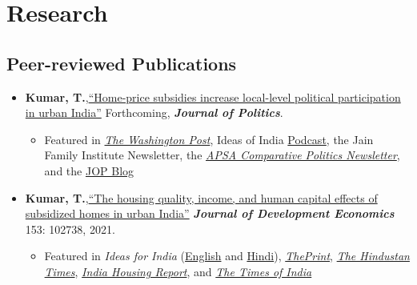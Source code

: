 \documentclass[11pt]{article}
\begin{document}
	
\vspace{2mm}
\color{MidnightBlue}

\section*{Research}
\color{Black}


\subsection*{Peer-reviewed Publications}
\begin{itemize}
	



			\item[] \textbf{Kumar, T.},\href{https://doi.org/10.1086/715605}{``Home-price subsidies increase local-level political participation in urban India''} Forthcoming, \textit{\textbf{Journal of Politics}}.
			\begin{itemize}[nosep]
			\item Featured in \href{https://www.washingtonpost.com/news/monkey-cage/wp/2019/01/31/heres-what-gavin-newsom-elizabeth-warren-and-microsoft-should-know-if-want-to-end-the-affordable-housing-crisis/?tid=sm_tw_cage}{\textit{The Washington Post}},  Ideas of India \href{https://www.discoursemagazine.com/politics/2020/12/24/ideas-of-india-how-does-subsidizing-housing-prices-shape-political-behavior}{Podcast},  the Jain Family Institute Newsletter, the \href{https://www.comparativepoliticsnewsletter.org/wp-content/uploads/2020/05/Spring-Newsletter-2020.pdf}{\textit{APSA Comparative Politics Newsletter}}, and the \href{https://jop.blogs.uni-hamburg.de/home-price-subsidies-increase-local-level-political-participation-in-urban-india/}{JOP Blog}  			\end{itemize}
			\item[]\textbf{Kumar, T.},\href{https://doi.org/10.1016/j.jdeveco.2021.102738}{``The housing quality, income, and human capital effects of subsidized homes in urban India''} \textit{\textbf{Journal of Development Economics}} 153: 102738, 2021.
\begin{itemize}
	\item Featured in \textit{Ideas for India} (\href{https://www.ideasforindia.in/topics/poverty-inequality/household-level-effects-of-affordable-housing-evidence-from-mumbai.html}{English} and \href{https://www.ideasforindia.in/topics/poverty-inequality/household-level-effects-of-affordable-housing-evidence-from-mumbai-hindi.html}{Hindi}), \href{https://theprint.in/opinion/mumbai-residents-win-govt-housing-lottery-and-spend-more-on-kids-education-jobs-study/290485/}{\textit{ThePrint}}, \href{https://www.hindustantimes.com/opinion/housing-is-a-welfare-weapon-it-can-help-people-escape-poverty-101629993983576.html}{\textit{The Hindustan Times}}, \href{https://indiahousingreport.in/outputs/opinion/housing-is-a-welfare-weapon-it-can-help-people-escape-poverty/}{\textit{India Housing Report}}, and \href{https://timesofindia.indiatimes.com/city/mumbai/mhada-home-winners-see-upswing-in-family-edu-pay-in-mumbai-study/articleshow/86468320.cms}{\textit{The Times of India}}


\end{itemize}
\end{itemize}
\end{document}
